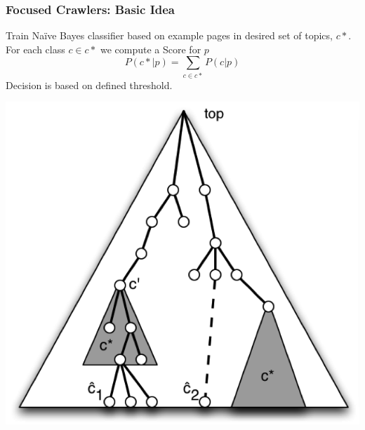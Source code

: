 \documentclass{beamer}
\begin{document}
\begin{frame} \frametitle{Focused Crawlers: Basic Idea}


Train Na\"ive Bayes classifier based on example pages in desired set of
topics, $c*$. For each class $c \in c*$ we compute a Score
for $p$ 
\begin{displaymath}
    P(c*|p) = \sum_{c \in c*} P(c|p)
\end{displaymath}
Decision is based on defined threshold.

\begin{center}
    \includegraphics[width=.4\textwidth]{ODP}
\end{center}

\end{frame}














\end{document}
